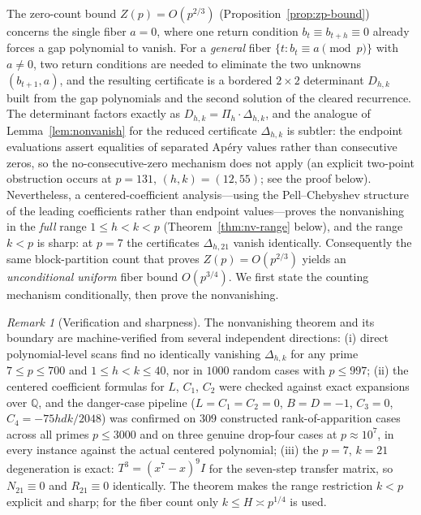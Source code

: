 \documentclass[11pt]{article}
\theoremstyle{definition}
\theoremstyle{remark}
\newtheorem{remark}[theorem]{Remark}
\begin{document}
The zero-count bound $Z(p) = O(p^{2/3})$
(Proposition~\ref{prop:zp-bound}) concerns the single
fiber $a = 0$, where one return condition
$b_t \equiv b_{t+h} \equiv 0$ already forces a gap
polynomial to vanish.
For a \emph{general} fiber
$\{t : b_t \equiv a \pmod p\}$ with $a \ne 0$, two return
conditions are needed to eliminate the two unknowns
$(b_{t+1}, a)$, and the resulting certificate is a
bordered $2 \times 2$ determinant $D_{h,k}$ built from
the gap polynomials and the second solution of the
cleared recurrence.
The determinant factors exactly as
$D_{h,k} = \Pi_h \cdot \Delta_{h,k}$, and the analogue of
Lemma~\ref{lem:nonvanish} for the reduced certificate
$\Delta_{h,k}$ is subtler: the endpoint
evaluations assert equalities of separated Ap\'ery values
rather than consecutive zeros, so the no-consecutive-zero
mechanism does not apply (an explicit two-point
obstruction occurs at $p = 131$, $(h,k) = (12,55)$; see
the proof below).
Nevertheless, a centered-coefficient analysis---using the
Pell--Chebyshev structure of the leading coefficients
rather than endpoint values---proves the nonvanishing in
the \emph{full} range $1 \le h < k < p$
(Theorem~\ref{thm:nv-range} below), and the range $k < p$
is sharp: at $p = 7$ the certificates $\Delta_{h,21}$
vanish identically.
Consequently the same block-partition count that proves
$Z(p) = O(p^{2/3})$ yields an \emph{unconditional uniform}
fiber bound $O(p^{3/4})$.
We first state the counting mechanism conditionally, then
prove the nonvanishing.





\begin{remark}[Verification and sharpness]
\label{rem:nv-status}
The nonvanishing theorem and its boundary are
machine-verified from several independent directions:
(i) direct polynomial-level scans find no identically
vanishing $\Delta_{h,k}$ for any prime $7 \le p \le 700$
and $1 \le h < k \le 40$, nor in $1000$ random cases
with $p \le 997$;
(ii) the centered coefficient formulas for $L$, $C_1$,
$C_2$ were checked against exact expansions over
$\mathbb Q$, and the danger-case pipeline
($L = C_1 = C_2 = 0$, $B = D = -1$,
$C_3 = 0$, $C_4 = -75hdk/2048$) was confirmed on $309$
constructed rank-of-apparition cases across all primes
$p \le 3000$ and on three genuine drop-four cases at
$p \approx 10^7$, in every instance against the actual
centered polynomial;
(iii) the $p = 7$, $k = 21$ degeneration is exact:
$T^3 = (x^7 - x)^9 I$ for the seven-step transfer
matrix, so $N_{21} \equiv 0$ and $R_{21} \equiv 0$
identically.
The theorem makes the range restriction $k < p$
explicit and sharp; for the fiber count only
$k \le H \asymp p^{1/4}$ is used.
\end{remark}
\end{document}
